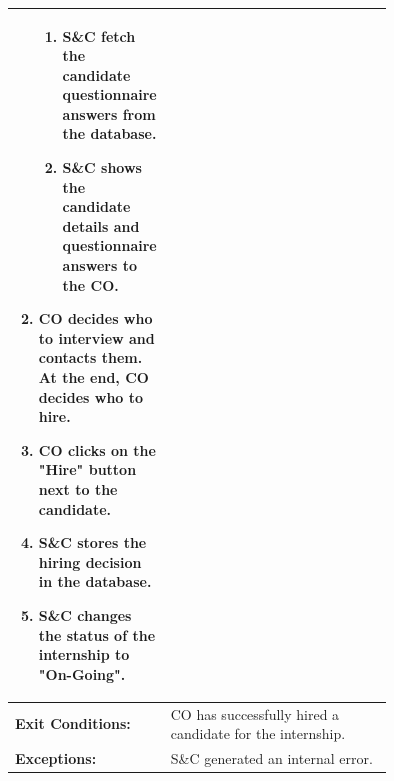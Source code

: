 \begin{center}
\begin{longtable}{|l|p{0.75\linewidth}|}
\begin{enumerate}
\begin{enumerate}
                      \item S\&C fetch the candidate questionnaire answers from the database.
                      \item S\&C shows the candidate details and questionnaire answers to the CO.
                  \end{enumerate}
                                         \item CO decides who to interview and contacts them. At the end, CO decides who to hire.
                                         \item CO clicks on the "Hire" button next to the candidate.
                                         \item S\&C stores the hiring decision in the database.
                                         \item S\&C changes the status of the internship to "On-Going".
                                     \end{enumerate} \\
        \hline
        \textbf{Exit Conditions:}  & CO has successfully hired a candidate for the internship.                               \\
        \hline
        \textbf{Exceptions:}       & S\&C generated an internal error.                                                       \\
        \hline
    \end{longtable}
\end{center}

